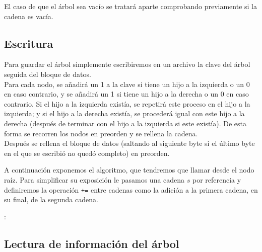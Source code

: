 \documentclass{article}
\newenvironment{algo}{
\vspace*{0.5cm}
\begin{algorithm}[H]}{
\end{algorithm}
\vspace*{0.5cm}
}
\begin{document}
El caso de que el árbol sea vacío se tratará aparte comprobando previamente si la
cadena es vacía.

\subsection{Escritura}

Para guardar el árbol simplemente escribiremos en un archivo la clave del árbol
seguida del bloque de datos. \\

Para cada nodo, se añadirá un 1 a la clave si tiene un hijo a la izquierda o un 0
en caso contrario, y se añadirá un 1 si tiene un hijo a la derecha o un 0 en caso
contrario. Si el hijo a la izquierda existía, se repetirá este proceso en el hijo
a la izquierda; y si el hijo a la derecha existía, se procederá igual con este hijo
a la derecha (después de terminar con el hijo a la izquierda si este existía). De
esta forma se recorren los nodos en preorden y se rellena la cadena. \\

Después se rellena el bloque de datos (saltando al siguiente byte si el último
byte en el que se escribió no quedó completo) en preorden.

A continuación exponemos el algoritmo, que tendremos que llamar desde el nodo
raíz. Para simplificar su exposición le pasamos una cadena $s$ por referencia y
definiremos la operación \texttt{+=} entre cadenas como la adición a la primera
cadena, en su final, de la segunda cadena.

\begin{algo}
: \\

\BlankLine


\BlankLine


\end{algo}

\subsection{Lectura de información del árbol}
\end{document}
